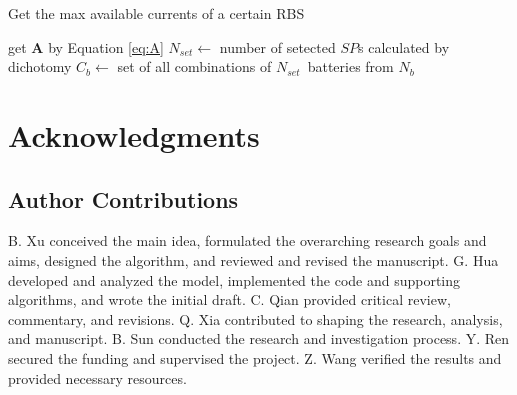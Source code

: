 \documentclass{article}
\begin{document}
\begin{algorithm}
    \caption{Get the max available currents of a certain RBS}\label{alg:greedy}
    \KwResult{$\max \eta$}
    get $\bm{A}$ by Equation \ref{eq:A}\;
    {
        $N_{set} \leftarrow$ number of setected $SP$s calculated by dichotomy\;
        $C_b    \leftarrow$ set of all combinations of $N_{set} $~batteries from $N_b$\;
    }
\end{algorithm}


\section*{Acknowledgments}

\subsection*{Author Contributions} 

B. Xu conceived the main idea, formulated the overarching research goals and aims, designed the algorithm, and reviewed and revised the manuscript.
G. Hua developed and analyzed the model, implemented the code and supporting algorithms, and wrote the initial draft.
C. Qian provided critical review, commentary, and revisions.
Q. Xia contributed to shaping the research, analysis, and manuscript.
B. Sun conducted the research and investigation process.
Y. Ren secured the funding and supervised the project.
Z. Wang verified the results and provided necessary resources.
\end{document}
